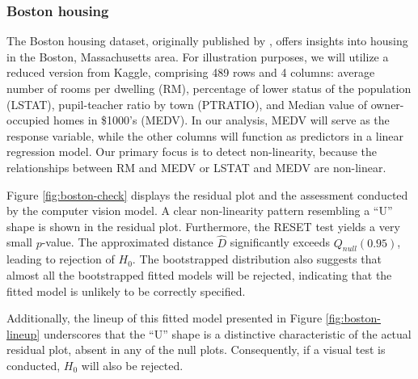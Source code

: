 \documentclass[]{interact}
\theoremstyle{plain}%
\theoremstyle{definition}
\theoremstyle{remark}
\begin{document}
\subsubsection{Boston housing}\label{boston-housing}

The Boston housing dataset, originally published by
\citet{harrison1978hedonic}, offers insights into housing in the Boston,
Massachusetts area. For illustration purposes, we will utilize a reduced
version from Kaggle, comprising 489 rows and 4 columns: average number
of rooms per dwelling (RM), percentage of lower status of the population
(LSTAT), pupil-teacher ratio by town (PTRATIO), and Median value of
owner-occupied homes in \$1000's (MEDV). In our analysis, MEDV will
serve as the response variable, while the other columns will function as
predictors in a linear regression model. Our primary focus is to detect
non-linearity, because the relationships between RM and MEDV or LSTAT
and MEDV are non-linear.

Figure \ref{fig:boston-check} displays the residual plot and the
assessment conducted by the computer vision model. A clear non-linearity
pattern resembling a ``U'' shape is shown in the residual plot.
Furthermore, the RESET test yields a very small \(p\)-value. The
approximated distance \(\hat{D}\) significantly exceeds
\(Q_{null}(0.95)\), leading to rejection of \(H_0\). The bootstrapped
distribution also suggests that almost all the bootstrapped fitted
models will be rejected, indicating that the fitted model is unlikely to
be correctly specified.

Additionally, the lineup of this fitted model presented in Figure
\ref{fig:boston-lineup} underscores that the ``U'' shape is a
distinctive characteristic of the actual residual plot, absent in any of
the null plots. Consequently, if a visual test is conducted, \(H_0\)
will also be rejected.
\end{document}
